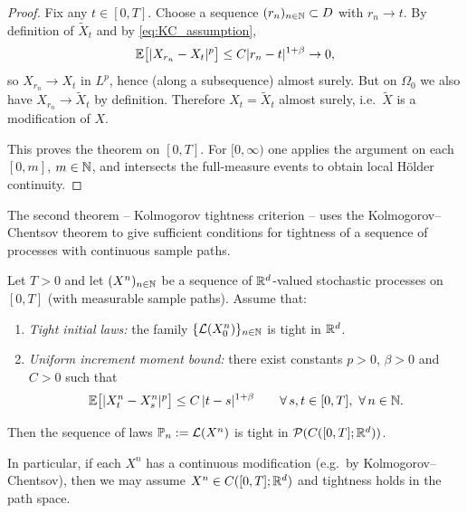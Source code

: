\begin{proof}[Proof]
\medskip
\noindent{}
Fix any $t\in[0,T]$.
Choose a sequence $(r_n)_{n\in\mathbb{N}}\subset D$ with $r_n\to t$.
By definition of $\widetilde X_t$ and by \eqref{eq:KC_assumption},
\[
\mathbb{E}\bigl[|X_{r_n}-X_t|^p\bigr]\le C|r_n-t|^{1+\beta}\to 0,
\]
so $X_{r_n}\to X_t$ in $L^p$, hence (along a subsequence) almost surely.
But on $\Omega_0$ we also have $X_{r_n}\to \widetilde X_t$ by definition.
Therefore $X_t=\widetilde X_t$ almost surely, i.e.\ $\widetilde X$ is a modification of $X$.

\medskip
This proves the theorem on $[0,T]$. For $[0,\infty)$ one applies the argument on each $[0,m]$,
$m\in\mathbb{N}$, and intersects the full-measure events to obtain local H\"older continuity.
\end{proof}


The second theorem -- Kolmogorov tightness criterion -- uses the Kolmogorov--Chentsov theorem to give
sufficient conditions for tightness of a sequence of processes with continuous sample paths.


\begin{theorem}\label{thm:kolmogorov_tightness}
Let $T>0$ and let $(X^n)_{n\in\mathbb{N}}$ be a sequence of $\mathbb{R}^d$-valued stochastic processes on $[0,T]$
(with measurable sample paths).
Assume that:
\begin{enumerate}[label=\textnormal{(\roman*)}, leftmargin=3.2em]
\item \emph{Tight initial laws:} the family $\{\mathcal{L}(X_0^n)\}_{n\in\mathbb{N}}$ is tight in $\mathbb{R}^d$.
\item \emph{Uniform increment moment bound:} there exist constants $p>0$, $\beta>0$ and $C>0$ such that
\begin{equation}\label{eq:kolmo_moment_bound}
\mathbb{E}\bigl[|X_t^n-X_s^n|^p\bigr]\le C\,|t-s|^{1+\beta}
\qquad\forall\, s,t\in[0,T],\ \forall\,n\in\mathbb{N}.
\end{equation}
\end{enumerate}
Then the sequence of laws $\mathbb{P}_n:=\mathcal{L}(X^n)$ is tight in $\mathcal{P}(C([0,T];\mathbb{R}^d))$.

In particular, if each $X^n$ has a continuous modification (e.g.\ by Kolmogorov--Chentsov),
then we may assume $X^n\in C([0,T];\mathbb{R}^d)$ and tightness holds in the path space.
\end{theorem}

